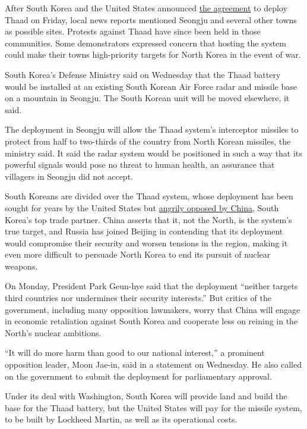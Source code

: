 After South Korea and the United States announced
\href{http://www.nytimes.com/2016/07/08/world/asia/south-korea-and-us-agree-to-deploy-missile-defense-system.html}{the
agreement} to deploy Thaad on Friday, local news reports mentioned
Seongju and several other towns as possible sites. Protests against
Thaad have since been held in those communities. Some demonstrators
expressed concern that hosting the system could make their towns
high-priority targets for North Korea in the event of war.

South Korea's Defense Ministry said on Wednesday that the Thaad battery
would be installed at an existing South Korean Air Force radar and
missile base on a mountain in Seongju. The South Korean unit will be
moved elsewhere, it said.

The deployment in Seongju will allow the Thaad system's interceptor
missiles to protect from half to two-thirds of the country from North
Korean missiles, the ministry said. It said the radar system would be
positioned in such a way that its powerful signals would pose no threat
to human health, an assurance that villagers in Seongju did not accept.

South Koreans are divided over the Thaad system, whose deployment has
been sought for years by the United States but
\href{http://www.nytimes.com/2016/07/09/world/asia/south-korea-us-thaad-china.html}{angrily
opposed by China}, South Korea's top trade partner. China asserts that
it, not the North, is the system's true target, and Russia has joined
Beijing in contending that its deployment would compromise their
security and worsen tensions in the region, making it even more
difficult to persuade North Korea to end its pursuit of nuclear weapons.

On Monday, President Park Geun-hye said that the deployment ``neither
targets third countries nor undermines their security interests.'' But
critics of the government, including many opposition lawmakers, worry
that China will engage in economic retaliation against South Korea and
cooperate less on reining in the North's nuclear ambitions.

``It will do more harm than good to our national interest,'' a prominent
opposition leader, Moon Jae-in, said in a statement on Wednesday. He
also called on the government to submit the deployment for parliamentary
approval.

Under its deal with Washington, South Korea will provide land and build
the base for the Thaad battery, but the United States will pay for the
missile system, to be built by Lockheed Martin, as well as its
operational costs.

